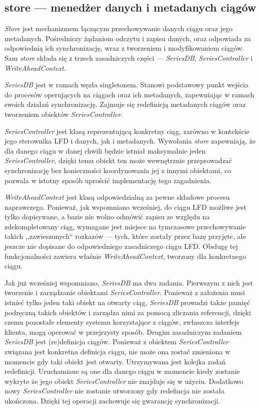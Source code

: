 \documentclass[a4paper,polish,12pt,twoside]{article}
\begin{document}
	\subsection{store --- menedżer danych i metadanych ciągów}
		\label{sec:part:store}
\textit{Store} jest mechanizmem łączącym przechowywanie danych ciągu oraz jego metadanych. Pośredniczy żądaniom odczytu i zapisu danych, oraz odpowiada za odpowiednią ich synchronizację, wraz z tworzeniem i modyfikowaniem ciągów. Sam \textit{store} składa się z trzech zasadniczych części --- \textit{SeriesDB}, \textit{SeriesController} i \textit{WriteAheadContext}.
	
\textit{SeriesDB} jest w ramach węzła singletonem. Stanowi podstawowy punkt wejścia do procesów operujących na ciągach oraz ich metadanych, zapewniając w ramach swoich działań synchronizację. Zajmuje się  redefinicją metadanych ciągów oraz tworzeniem obiektów \textit{SeriesController}.

\textit{SeriesController} jest klasą reprezentującą konkretny ciąg, zarówno w kontekście jego sterownika LFD i danych, jak i metadanych. Wywołania \textit{store} zapewniają, że dla danego ciągu w danej chwili będzie istniał maksymalnie jeden \textit{SeriesController}, dzięki temu obiekt ten może wewnętrznie przeprowadzać synchronizację bez konieczności koordynowania jej z innymi obiektami, co pozwala w istotny sposób uprościć implementację tego zagadnienia.

\textit{WriteAheadContext} jest klasą odpowiedzialną za pewne składowe procesu naprawczego. Ponieważ, jak wspomniano wcześniej, do ciągu LFD możliwe jest tylko dopisywane, a bazie nie wolno odmówić zapisu ze względu na zdekompletowany ciąg, wymagane jest miejsce na tymczasowe przechowywanie takich ,,zawieszonych`` rozkazów --- tych, które zostały przez bazę przyjęte, ale jeszcze nie dopisane do odpowiedniego zasadniczego ciągu LFD. Obsługę tej funkcjonalności zawiera właśnie \textit{WriteAheadContext}, tworzony dla konkretnego ciągu.

Jak już wcześniej wspomniano, \textit{SeriesDB} ma dwa zadania. Pierwszym z nich jest tworzenie i zarządzanie obiektami \textit{SeriesController}. Ponieważ z założenia musi istnieć tylko jeden taki obiekt na otwarty ciąg, \textit{SeriesDB} prowadzi także pamięć podręczną takich obiektów i zarządza nimi za pomocą zliczania referencji, dzięki czemu pozostałe elementy systemu korzystające z ciągów, zwłaszcza interfejs klienta, mogą operować w przejrzysty sposób. Drugim zasadniczym zadaniem \textit{SeriesDB} jest (re)definicja ciągów. Ponieważ z obiektem \textit{SeriesController} związana jest konkretna definicja ciągu, nie może ona zostać zmieniona w momencie gdy taki obiekt jest otwarty. Utrzymywana jest kolejka zadań redefinicji. Uruchamiane są one dla danego ciągu w momencie kiedy zostanie wykryte że jego obiekt \textit{SeriesController} nie znajduje się w użyciu. Dodatkowo nowy \textit{SeriesController} nie zostanie utworzony gdy redefincja nie została ukończona. Dzięki tej operacji zachowuje się gwarancję synchronizacji.
\end{document}
